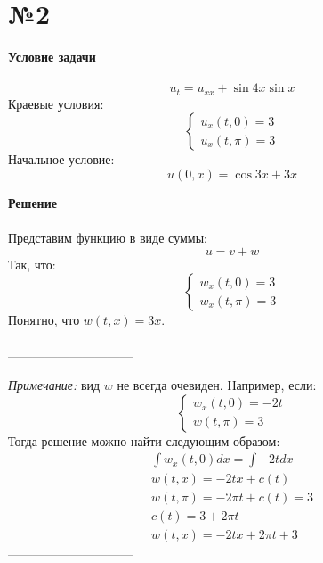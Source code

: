 \documentclass[11pt]{article}
\newenvironment{me}{
  \begin{equation}
    \begin{gathered}
      }{
    \end{gathered}
  \end{equation}
}
\newenvironment{ce}{
  \begin{equation}
    \begin{cases}
      }{
    \end{cases}
  \end{equation}
}
\begin{document}
\begin{sloppypar}
  \section*{№2}
  \textbf{Условие задачи} \\~\\
  \begin{equation}
    u_t = u_{xx} + \sin{4x}\sin{x}
  \end{equation}
  Краевые условия:
  \begin{ce}
    u_x(t, 0) = 3 \\
    u_x(t, \pi) = 3
  \end{ce}
  Начальное условие:
  \begin{equation}
    u(0, x) = \cos{3x} + 3x
  \end{equation}
  
  \textbf{Решение} \\~\\
  Представим функцию в виде суммы:
  \begin{equation}
    u = v + w
  \end{equation}
  Так, что:
  \begin{ce}
    w_x(t, 0) = 3 \\
    w_x(t, \pi) = 3
  \end{ce}
  Понятно, что $w(t, x) = 3x$. \\~\\
  
  ------------------------------
  
  \textit{Примечание:} вид $w$ не всегда очевиден. Например, если:
  \begin{ce}
    w_x(t, 0) = -2t \\
    w(t, \pi) = 3
  \end{ce}
  Тогда решение можно найти следующим образом:
  \begin{me}
    \int w_x(t, 0) dx = \int -2t dx \\
    w(t, x) = -2tx + c(t) \\
    w(t, \pi) = -2\pi t + c(t) = 3 \\
    c(t) = 3 + 2\pi t \\
    w(t, x) = -2tx + 2\pi t + 3
  \end{me}
  ------------------------------
  

\end{sloppypar}
\end{document}
